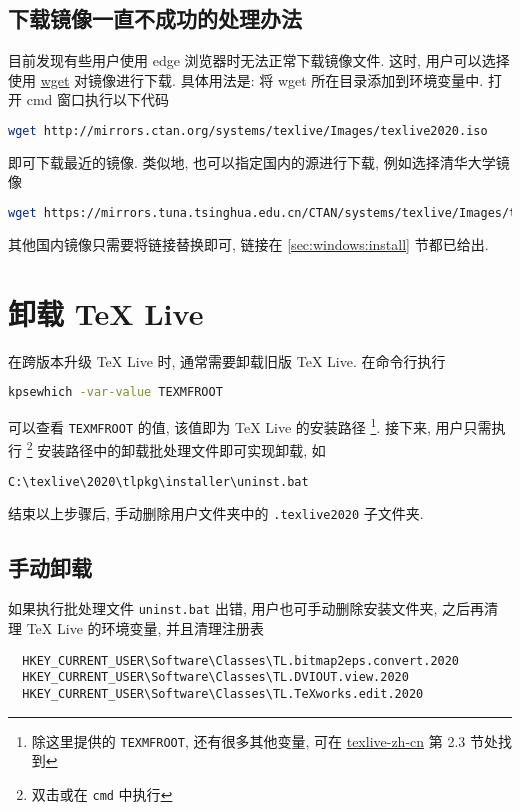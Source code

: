 \subsection{下载镜像一直不成功的处理办法}

目前发现有些用户使用 \textsf{edge} 浏览器时无法正常下载镜像文件.
这时,
用户可以选择使用 \href{https://eternallybored.org/misc/wget/}{wget} 对镜像进行下载.
具体用法是:
将 \textsf{wget} 所在目录添加到环境变量中.
打开 \textsf{cmd} 窗口执行以下代码
\begin{lstlisting}[language = bash]
  wget http://mirrors.ctan.org/systems/texlive/Images/texlive2020.iso
\end{lstlisting}
即可下载最近的镜像.
类似地,
也可以指定国内的源进行下载,
例如选择清华大学镜像
\begin{lstlisting}[language = bash]
  wget https://mirrors.tuna.tsinghua.edu.cn/CTAN/systems/texlive/Images/texlive2020.iso
\end{lstlisting}
其他国内镜像只需要将链接替换即可,
链接在 \ref{sec:windows:install} 节都已给出.

\section{卸载 \TeX{} Live}

在跨版本升级 \TeX{} Live 时, 通常需要卸载旧版 \TeX{} Live.
在命令行执行
\begin{lstlisting}[language=bash]
  kpsewhich -var-value TEXMFROOT
\end{lstlisting}
可以查看 \texttt{TEXMFROOT} 的值,
该值即为 \TeX{} Live 的安装路径%
\footnote{%
  除这里提供的 \texttt{TEXMFROOT}, 还有很多其他变量, 可在
  \href{https://www.tug.org/texlive/doc/texlive-zh-cn/texlive-zh-cn.pdf}{texlive-zh-cn}
  第 2.3 节处找到
}. 
接下来,
用户只需执行%
\footnote{双击或在 \texttt{cmd} 中执行}%
安装路径中的卸载批处理文件即可实现卸载, 如
\begin{lstlisting}[language=bash]
  C:\texlive\2020\tlpkg\installer\uninst.bat
\end{lstlisting}
结束以上步骤后,
手动删除用户文件夹中的 \texttt{.texlive2020} 子文件夹.

\subsection{手动卸载}

如果执行批处理文件 \texttt{uninst.bat} 出错,
用户也可手动删除安装文件夹,
之后再清理 \TeX{} Live 的环境变量,
并且清理注册表
\begin{lstlisting}
  HKEY_CURRENT_USER\Software\Classes\TL.bitmap2eps.convert.2020
  HKEY_CURRENT_USER\Software\Classes\TL.DVIOUT.view.2020
  HKEY_CURRENT_USER\Software\Classes\TL.TeXworks.edit.2020
\end{lstlisting}


